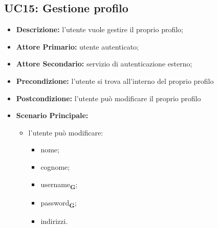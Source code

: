 \subsection{UC15: Gestione profilo}
\label{sec:UC15}
\begin{itemize}
    \item \textbf{Descrizione:} l'utente vuole gestire il proprio profilo;
    \item \textbf{Attore Primario:} utente autenticato;
    \item \textbf{Attore Secondario:} servizio di autenticazione esterno;
    \item \textbf{Precondizione:} l'utente si trova all'interno del proprio profilo
    \item \textbf{Postcondizione:} l'utente può modificare il proprio profilo
    \item \textbf{Scenario Principale:}
    \begin{itemize}
        \item  l'utente può modificare:
        \begin{itemize}
            \item nome;
            \item cognome;
            \item username\textsubscript{\textbf{G}};
            \item password\textsubscript{\textbf{G}};
            \item indirizzi.
        \end{itemize}
    \end{itemize}
\end{itemize}